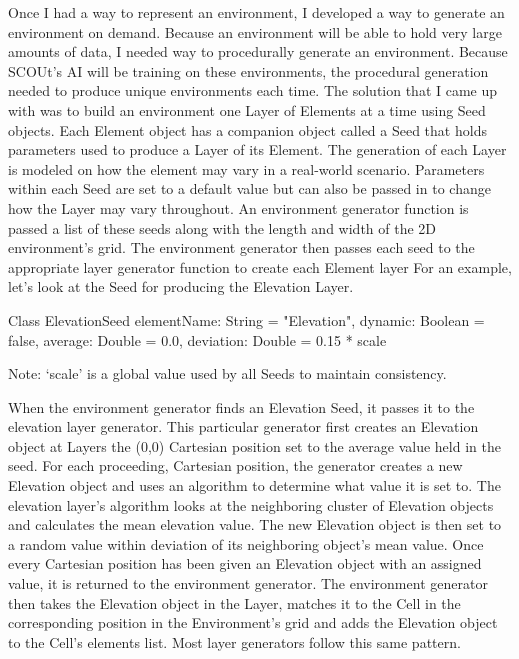 Once I had a way to represent an environment, I developed a way to generate an environment on demand.
Because an environment will be able to hold very large amounts of data, I needed way to procedurally generate an environment.
Because SCOUt’s AI will be training on these environments, the procedural generation needed to produce unique environments each time.
The solution that I came up with was to build an environment one Layer of Elements at a time using Seed objects.
Each Element object has a companion object called a Seed that holds parameters used to produce a Layer of its Element.
The generation of each Layer is modeled on how the element may vary in a real-world scenario.
Parameters within each Seed are set to a default value but can also be passed in to change how the Layer may vary throughout.
An environment generator function is passed a list of these seeds along with the length and width of the 2D environment’s grid.
The environment generator then passes each seed to the appropriate layer generator function to create each Element layer
For an example, let’s look at the Seed for producing the Elevation Layer.

Class ElevationSeed {
	elementName: String = "Elevation",
    	dynamic: Boolean = false,
    	average: Double = 0.0,
    	deviation: Double = 0.15 * scale
}

Note: ‘scale’ is a global value used by all Seeds to maintain consistency.

When the environment generator finds an Elevation Seed, it passes it to the elevation layer generator.
This particular generator first creates an Elevation object at Layers the (0,0) Cartesian position set to the average value held in the seed.
For each proceeding, Cartesian position, the generator creates a new Elevation object and uses an algorithm to determine what value it is set to.
The elevation layer’s algorithm looks at the neighboring cluster of Elevation objects and calculates the mean elevation value.
The new Elevation object is then set to a random value within deviation of its neighboring object’s mean value.
Once every Cartesian position has been given an Elevation object with an assigned value, it is returned to the environment generator.
The environment generator then takes the Elevation object in the Layer, matches it to the Cell in the corresponding position in the Environment’s grid and adds the Elevation object to the Cell’s elements list.
Most layer generators follow this same pattern.

